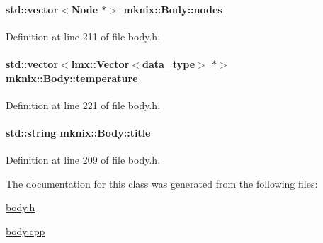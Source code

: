 \paragraph[{nodes}]{\setlength{\rightskip}{0pt plus 5cm}std\+::vector$<${\bf Node} $\ast$$>$ mknix\+::\+Body\+::nodes\hspace{0.3cm}{\ttfamily [protected]}}\label{classmknix_1_1_body_acbfce7ce37d4e7f616850da2a5850280}


Definition at line 211 of file body.\+h.

\hypertarget{classmknix_1_1_body_a29e955d93a12919d2adfec07a0f2f566}{}
\paragraph[{temperature}]{\setlength{\rightskip}{0pt plus 5cm}std\+::vector$<${\bf lmx\+::\+Vector}$<${\bf data\+\_\+type}$>$ $\ast$$>$ mknix\+::\+Body\+::temperature\hspace{0.3cm}{\ttfamily [protected]}}\label{classmknix_1_1_body_a29e955d93a12919d2adfec07a0f2f566}


Definition at line 221 of file body.\+h.

\hypertarget{classmknix_1_1_body_a3c05cdff2d5f2b150046cd734d0ed7ce}{}
\paragraph[{title}]{\setlength{\rightskip}{0pt plus 5cm}std\+::string mknix\+::\+Body\+::title\hspace{0.3cm}{\ttfamily [protected]}}\label{classmknix_1_1_body_a3c05cdff2d5f2b150046cd734d0ed7ce}


Definition at line 209 of file body.\+h.



The documentation for this class was generated from the following files\+:\begin{DoxyCompactItemize}
\item 
\hyperlink{body_8h}{body.\+h}\item 
\hyperlink{body_8cpp}{body.\+cpp}\end{DoxyCompactItemize}
